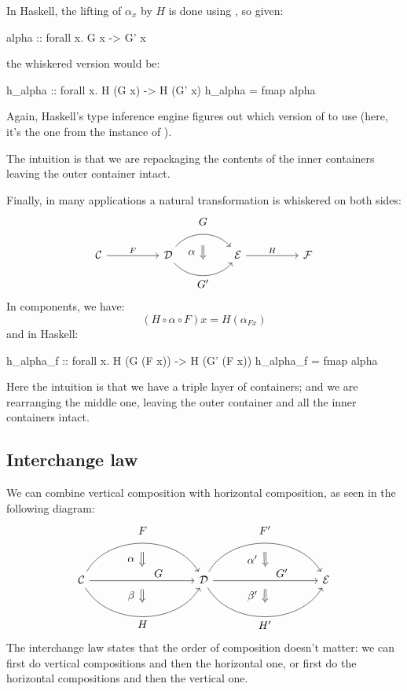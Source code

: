 \documentclass[DaoFP]{subfiles}
\begin{document}
In Haskell, the lifting of $\alpha_x$ by $H$ is done using , so given:
\begin{haskell}
alpha :: forall x. G x -> G' x
\end{haskell}
the whiskered version would be:
\begin{haskell}
h_alpha :: forall x. H (G x) -> H (G' x)
h_alpha = fmap alpha
\end{haskell}
Again, Haskell's type inference engine figures out which version of  to use (here, it's the one from the  instance of ).

The intuition is that we are repackaging the contents of the inner containers leaving the outer container intact.

Finally, in many applications a natural transformation is whiskered on both sides:
\[
\begin{tikzcd}[column sep=huge]
\mathcal{C}
 \arrow[r, "F"]
 &
\mathcal{D}
  \arrow[bend left=50]{r}[name=U1, label=above:$G$]{}
  \arrow[bend right=50]{r}[name=D1, label=below:$G'$]{} 
 &
\mathcal{E}
  \arrow[shorten <=10pt,shorten >=10pt,Rightarrow,to path={(U1) -- node[label=left:$\alpha$] {} (D1)}]{}
  \arrow[r, "H"]
 &
 \mathcal{F}
\end{tikzcd}
\]
In components, we have:
\[ (H \circ \alpha \circ F) x = H (\alpha_{F x})\]
and in Haskell:
\begin{haskell}
h_alpha_f :: forall x. H (G (F x)) -> H (G' (F x))
h_alpha_f = fmap alpha
\end{haskell}

Here the intuition is that we have a triple layer of containers; and we are rearranging the middle one, leaving the outer container and all the inner containers intact.

\subsection{Interchange law}

We can combine vertical composition with horizontal composition, as seen in the following diagram:
\[
\begin{tikzcd}[column sep=huge]
\mathcal{C}
  \arrow[bend left=60]{rr}[name=U, label=above:$F$]{}
  \arrow[]{rr}[name=M, label={[xshift=15pt, yshift=-5pt]:$G$}]{} 
  \arrow[bend right=60]{rr}[name=D, label=below:$H$]{} 
 &&
\mathcal{D}
  \arrow[bend left=60]{rr}[name=U1, label=above:$F'$]{}
  \arrow[]{rr}[name=M1, label={[xshift=15pt, yshift=-5pt]:$G'$}]{} 
  \arrow[bend right=60]{rr}[name=D1, label=below:$H'$]{} 
&&
\mathcal{E}
  \arrow[shorten <=8pt, shorten >=8pt,Rightarrow, to path={(U) -- node[label=left:$\alpha$] {} (M)}]{}
  \arrow[shorten <=8pt, shorten >=8pt,Rightarrow, to path={(M) -- node[label=left:$\beta$] {} (D)}]{}
  \arrow[shorten <=8pt, shorten >=8pt,Rightarrow, to path={(U1) -- node[label=left:$\alpha'$] {} (M1)}]{}
  \arrow[shorten <=8pt, shorten >=8pt,Rightarrow, to path={(M1) -- node[label=left:$\beta'$] {} (D1)}]{}
\end{tikzcd}
\]
The interchange law states that the order of composition doesn't matter: we can first do vertical compositions and then the horizontal one, or first do the horizontal compositions and then the vertical one.
\end{document}
